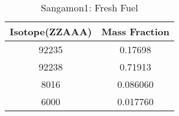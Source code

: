 \begin{table}[h!]
\centering
\begin{tabular}{|| c || c |}
\hline
Isotope(ZZAAA) & Mass Fraction \\
\hline \hline

92235 & 0.17698 \\
92238 & 0.71913 \\
8016 & 0.086060 \\
6000 & 0.017760 \\

\hline
\end{tabular}
\caption{Sangamon1: Fresh Fuel}
\label{table:sang0ffuel}
\end{table}